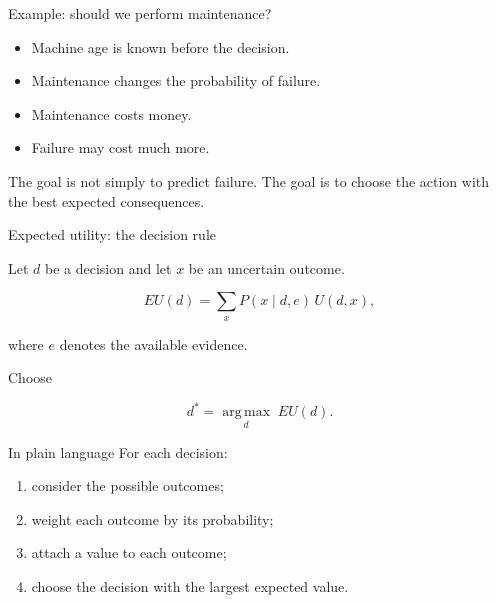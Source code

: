 \documentclass[aspectratio=43,11pt]{beamer}
\begin{document}
\begin{frame}{Example: should we perform maintenance?}

\begin{center}
\end{center}

\begin{itemize}
  \item Machine age is known before the decision.
  \item Maintenance changes the probability of failure.
  \item Maintenance costs money.
  \item Failure may cost much more.
\end{itemize}

The goal is not simply to predict failure. The goal is to choose the
action with the best expected consequences.

\end{frame}

\begin{frame}{Expected utility: the decision rule}

Let \(d\) be a decision and let \(x\) be an uncertain outcome.

\[
EU(d)
=
\sum_x P(x\mid d,e)\,U(d,x),
\]

where \(e\) denotes the available evidence.

Choose

\[
d^*
=
\underset{d}{\operatorname{arg\,max}}\;EU(d).
\]

\begin{block}{In plain language}
For each decision:
\begin{enumerate}
  \item consider the possible outcomes;
  \item weight each outcome by its probability;
  \item attach a value to each outcome;
  \item choose the decision with the largest expected value.
\end{enumerate}
\end{block}

\end{frame}
\end{document}
